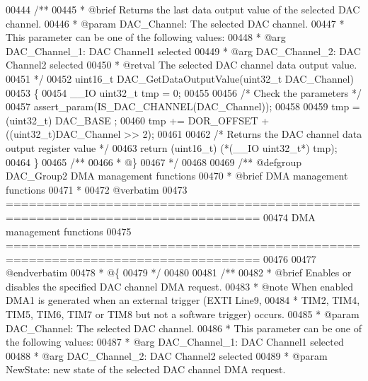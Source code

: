 \begin{DoxyCode}
00444 \textcolor{comment}{/**}
00445 \textcolor{comment}{  * @brief  Returns the last data output value of the selected DAC channel.}
00446 \textcolor{comment}{  * @param  DAC\_Channel: The selected DAC channel. }
00447 \textcolor{comment}{  *          This parameter can be one of the following values:}
00448 \textcolor{comment}{  *            @arg DAC\_Channel\_1: DAC Channel1 selected}
00449 \textcolor{comment}{  *            @arg DAC\_Channel\_2: DAC Channel2 selected}
00450 \textcolor{comment}{  * @retval The selected DAC channel data output value.}
00451 \textcolor{comment}{  */}
00452 uint16\_t DAC_GetDataOutputValue(uint32\_t DAC\_Channel)
00453 \{
00454   \_\_IO uint32\_t tmp = 0;
00455 
00456   \textcolor{comment}{/* Check the parameters */}
00457   assert_param(IS\_DAC\_CHANNEL(DAC\_Channel));
00458 
00459   tmp = (uint32\_t) DAC_BASE ;
00460   tmp += DOR_OFFSET + ((uint32\_t)DAC\_Channel >> 2);
00461 
00462   \textcolor{comment}{/* Returns the DAC channel data output register value */}
00463   \textcolor{keywordflow}{return} (uint16\_t) (*(\_\_IO uint32\_t*) tmp);
00464 \}
00465 \textcolor{comment}{/**}
00466 \textcolor{comment}{  * @\}}
00467 \textcolor{comment}{  */}
00468 
00469 \textcolor{comment}{/** @defgroup DAC\_Group2 DMA management functions}
00470 \textcolor{comment}{ *  @brief   DMA management functions}
00471 \textcolor{comment}{ *}
00472 \textcolor{comment}{@verbatim   }
00473 \textcolor{comment}{ ===============================================================================}
00474 \textcolor{comment}{                          DMA management functions}
00475 \textcolor{comment}{ ===============================================================================  }
00476 \textcolor{comment}{}
00477 \textcolor{comment}{@endverbatim}
00478 \textcolor{comment}{  * @\{}
00479 \textcolor{comment}{  */}
00480 
00481 \textcolor{comment}{/**}
00482 \textcolor{comment}{  * @brief  Enables or disables the specified DAC channel DMA request.}
00483 \textcolor{comment}{  * @note   When enabled DMA1 is generated when an external trigger (EXTI Line9,}
00484 \textcolor{comment}{  *         TIM2, TIM4, TIM5, TIM6, TIM7 or TIM8  but not a software trigger) occurs.}
00485 \textcolor{comment}{  * @param  DAC\_Channel: The selected DAC channel. }
00486 \textcolor{comment}{  *          This parameter can be one of the following values:}
00487 \textcolor{comment}{  *            @arg DAC\_Channel\_1: DAC Channel1 selected}
00488 \textcolor{comment}{  *            @arg DAC\_Channel\_2: DAC Channel2 selected}
00489 \textcolor{comment}{  * @param  NewState: new state of the selected DAC channel DMA request.}

\end{DoxyCode}

